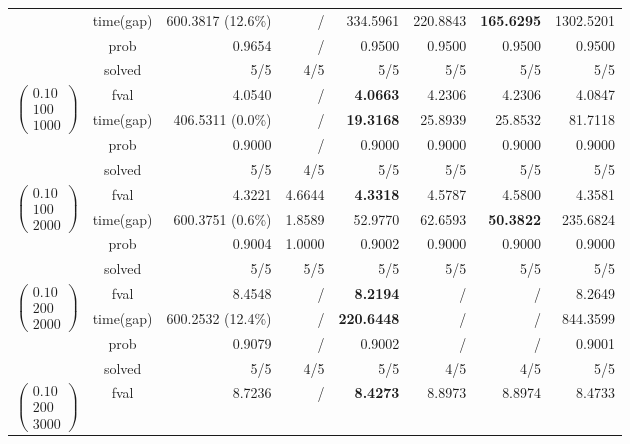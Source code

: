 \documentclass[11pt]{article}
\begin{document}
\begin{table}[ht!]
\begin{tabular}{ccrrrrrr}
& time(gap)  & 600.3817 (12.6\%) & / & 334.5961 & 220.8843 & \textbf{165.6295} & 1302.5201\\
& prob  & 0.9654 & / & 0.9500 & 0.9500 & 0.9500 & 0.9500\\
& solved & 5/5 & 4/5 & 5/5 & 5/5 & 5/5 & 5/5\\
\midrule\midrule
\multirow{4}{*}{$\left(\begin{array}{c} 0.10 \\ 100 \\ 1000 \end{array}\right)$} & fval  & 4.0540 & / & \textbf{4.0663} & 4.2306 & 4.2306 & 4.0847\\
& time(gap)  & 406.5311 (0.0\%)  & / & \textbf{19.3168} & 25.8939 & 25.8532 & 81.7118\\
& prob  & 0.9000 & / & 0.9000 & 0.9000 & 0.9000 & 0.9000\\
& solved & 5/5 & 4/5 & 5/5 & 5/5 & 5/5 & 5/5\\
\midrule
\multirow{4}{*}{$\left(\begin{array}{c} 0.10 \\ 100 \\ 2000 \end{array}\right)$} & fval  & 4.3221 & 4.6644 & \textbf{4.3318} & 4.5787 & 4.5800 & 4.3581\\
& time(gap)  & 600.3751 (0.6\%)  & 1.8589 & 52.9770 & 62.6593 & \textbf{50.3822} & 235.6824\\
& prob  & 0.9004 & 1.0000 & 0.9002 & 0.9000 & 0.9000 & 0.9000\\
& solved & 5/5 & 5/5 & 5/5 & 5/5 & 5/5 & 5/5\\
\midrule
\multirow{4}{*}{$\left(\begin{array}{c} 0.10 \\ 200 \\ 2000 \end{array}\right)$} & fval  & 8.4548 & / & \textbf{8.2194} & / & / & 8.2649\\
& time(gap)  & 600.2532 (12.4\%) & / & \textbf{220.6448} & / & / & 844.3599\\
& prob  & 0.9079 & / & 0.9002 & / & / & 0.9001\\
& solved & 5/5 & 4/5 & 5/5 & 4/5 & 4/5 & 5/5\\
\midrule
\multirow{4}{*}{$\left(\begin{array}{c} 0.10 \\ 200 \\ 3000 \end{array}\right)$} & fval  & 8.7236 & / & \textbf{8.4273} & 8.8973 & 8.8974 & 8.4733\\

\end{tabular}
\end{table}
\end{document}
